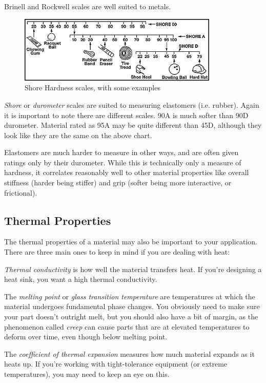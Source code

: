 \documentclass[10pt,letterpaper]{book}
\begin{document}
 Brinell and Rockwell scales are well suited to metals.
 
 \begin{figure}[H]
 	\includegraphics[width=0.85\textwidth]{imgs/shore_hardness.jpeg}
 	\caption{Shore Hardness scales, with some examples}
 \end{figure}
 
 \textit{Shore} or \textit{durometer} scales are suited to measuring elastomers (i.e. rubber). Again it is important to note there are different scales. 90A is much softer than 90D durometer. Material rated as 95A may be quite different than 45D, although they look like they are the same on the above chart.
 
 Elastomers are much harder to measure in other ways, and are often given ratings only by their durometer. While this is technically only a measure of hardness, it correlates reasonably well to other material properties like overall stiffness (harder being stiffer) and grip (softer being more interactive, or frictional).
 
 \subsection{Thermal Properties}
 
 The thermal properties of a material may also be important to your application. There are three main ones to keep in mind if you are dealing with heat:
 \begin{asparaitem}
 	\item \textit{Thermal conductivity} is how well the material transfers heat. If you're designing a heat sink, you want a high thermal conductivity.
 	\item The \textit{melting point} or \textit{glass transition temperature} are temperatures at which the material undergoes fundamental phase changes. You obviously need to make sure your part doesn't outright melt, but you should also have a bit of margin, as the phenomenon called \textit{creep} can cause parts that are at elevated temperatures to deform over time, even though below melting point.
 	\item The \textit{coefficient of thermal expansion} measures how much material expands as it heats up. If you're working with tight-tolerance equipment (or extreme temperatures), you may need to keep an eye on this.
 \end{asparaitem}
  
\end{document}
